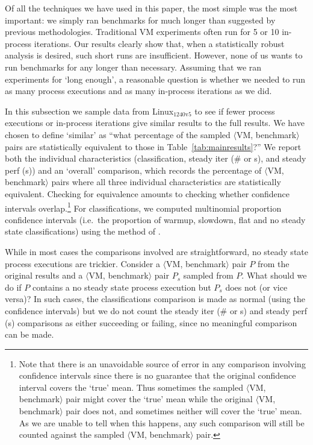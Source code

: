 \documentclass[acmsmall,screen]{acmart}
\newcommand{\bencherseven}{Linux$_\mathrm{1240v5}$\xspace}
\newcommand{\vmbpair}{$\langle$VM, benchmark$\rangle$\xspace}
\begin{document}
Of all the techniques we have used in this paper, the most simple was the most
important: we simply ran benchmarks for much longer than suggested by previous methodologies.
Traditional VM experiments often run for 5 or 10 in-process iterations. Our results
clearly show that, when a statistically robust analysis is desired, such short
runs are insufficient. However, none of us wants to run benchmarks for any longer
than necessary. Assuming that we ran
experiments for `long enough', a reasonable question is whether we needed to run
as many process executions and as many in-process iterations as we did.

In this subsection we sample data from \bencherseven to see if fewer
process executions or in-process iterations give similar results to the full
results. We have chosen to define `similar' as ``what percentage of the sampled
\vmbpair pairs are statistically equivalent to those in Table~\ref{tab:mainresults}?'' We report both
the individual characteristics (classification,
steady iter (\# or s), and steady perf (s)) and an `overall' comparison,
which records the percentage of \vmbpair pairs where all three individual
characteristics are statistically equivalent. Checking for equivalence amounts to
checking whether confidence intervals overlap.\footnote{Note that there is an unavoidable
source of error in any comparison involving confidence intervals since there is no
guarantee that the original confidence interval covers the `true' mean.
Thus sometimes the sampled \vmbpair pair might cover the `true' mean
while the original \vmbpair pair does not, and sometimes neither will
cover the `true' mean. As we are unable to tell when
this happens, any such comparison will still be counted against the sampled
\vmbpair pair.}
For classifications, we computed multinomial proportion confidence
intervals (i.e.~the proportion of warmup, slowdown, flat and no
steady state classifications) using the method of \cite{sison95simultaneous}.

While in most cases the comparisons involved are straightforward,
no steady state process executions are trickier.
Consider a \vmbpair pair $P$ from the original results and a \vmbpair pair $P_s$
sampled from $P$. What should we do if $P$ contains a no steady state process
execution but $P_s$ does not (or vice versa)? In such cases,
the classifications comparison is made as normal (using the
confidence intervals) but we do not count the steady iter (\# or s) and
steady perf (s) comparisons as either succeeding or failing, since no meaningful
comparison can be made.
\end{document}
